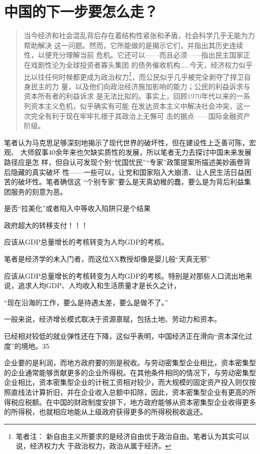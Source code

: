 \chapter{中国的下一步要怎么走？}

\begin{quotation}
  当今经济和社会混乱背后存在着结构性紧张和矛盾，社会科学几乎无能为力帮助解决
  这一问题。然而，它所能做的是揭示它们，并指出其历史连续性，以便充分理解当前
  危机。它还可以——而且必须——指出民主国家正在戏剧性沦为全球投资者寡头集团
  的债务催收机构……今天，经济权力似乎比以往任何时候都更成为政治权力\footnote{笔者注：
    新自由主义所要求的是经济自由优于政治自由。笔者认为其实可以说，经济权力大
    于政治权力，政治从属于经济。}，而公民似乎几乎被完全剥夺了捍卫自身民主的力
  量，以及他们向政治经济施加影响的能力；公民的利益诉求与资本所有者的利益诉求
  是无法比拟的。事实上，回顾1970年代以来的一系列资本主义危机，似乎确实有可能
  在发达资本主义中解决社会冲突，这一次完全有利于现在牢牢扎根于其政治上无懈可
  击的据点——国际金融资产阶级。
\end{quotation}

笔者认为马克思足够深刻地揭示了现代世界的破坏性，但在建设性上乏善可陈，宏观、
大师叙事40余年来也欠缺实质性的发展，所以笔者无力去探讨中国未来发展路径应是怎
样，但自认可发现个别“忧国忧民”“专家”政策提案所描述美妙画卷背后隐藏的真实破坏
性——一些可以，让党和国家陷入大崩溃、让人民生活日益困苦的破坏性。笔者确信这
“个别专家”要么是天真幼稚的蠢，要么是为背后利益集团服务的刻意为恶。



是否“拉美化”或者陷入中等收入陷阱只是个结果

政府超大的转移支付！！！

应该从GDP总量增长的考核转变为人均GDP的考核。

笔者是经济学的未入门者，而这位XX教授却像是婴儿般“天真无邪”

应该从GDP总量增长的考核转变为人均GDP的考核。特别是对那些人口流出地来说，追求人均GDP、人均收入和生活质量才是长久之计，

“现在沿海的工作，要么是待遇太差，要么是做不了。”

一般来说，经济增长模式取决于资源禀赋，包括土地、劳动力和资本。

已经相对较低的就业弹性还在下降，这似乎表明，中国经济正在滑向“资本深化过度”的境地。35

企业要的是利润，而地方政府要的则是税收。与劳动密集型企业相比，资本密集型的企业通常能够贡献更多的企业所得税。在其他条件相同的情况下，与劳动密集型企业相比，资本密集型企业的计税工资相对较少，而大规模的固定资产投入则仅按照直线法计算折旧，并在企业收入总额中扣除，因此，资本密集型企业有更高的所得税应税额。在中国的财政制度安排下，地方政府能够从资本密集型企业收得更多的所得税，也就相应地能从上级政府获得更多的所得税税收返还。



